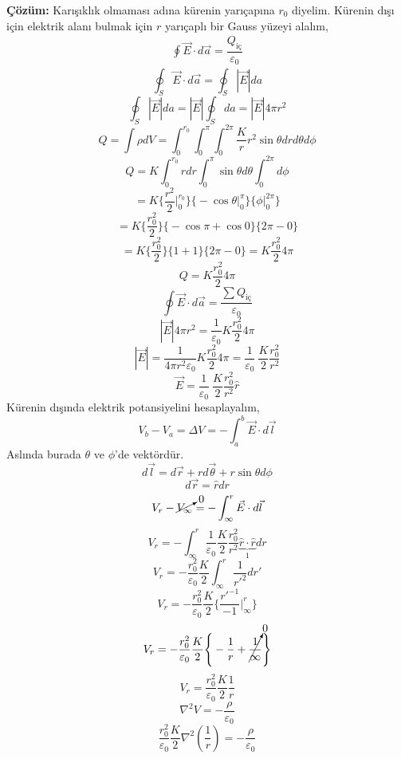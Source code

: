 	\textbf{Çözüm:} 
Karışıklık olmaması adına kürenin yarıçapına $r_{0}$ diyelim. Kürenin dışı için elektrik alanı bulmak için $r$ yarıçaplı bir Gauss yüzeyi alalım,
\begin{align*}
 \oint \Vec{E} \cdot d\Vec{a} = \dfrac{Q_{\textrm{iç}}}{ \varepsilon_{0}}
\end{align*}
\[  \oint_{S} \Vec{E} \cdot d\Vec{a} = \oint_{S} |\Vec{E}| da \]
\[\oint_{S}  |\Vec{E}| da =  |\Vec{E}| \oint_{S} da =  |\Vec{E}| 4 \pi r^{2} \]
\[ Q = \int \rho dV  = \int_{0}^{r_{0}} \int_{0}^{\pi}  \int_{0}^{2 \pi} \dfrac{K}{r} r^{2} \sin \theta dr d\theta d \phi \]
\[ Q =  K \int_{0}^{r_{0}}  r dr \int_{0}^{\pi} \sin \theta d\theta  \int_{0}^{2 \pi} d \phi \]
\[ =  K  \Bigg\{ \dfrac{r^{2}}{2} \Bigg|_{0}^{r_{0}} \Bigg\} \Bigg\{ - \cos \theta \Bigg|_{0}^{\pi} \Bigg\}  \Bigg\{ \phi \Bigg|_{0}^{2 \pi} \Bigg\} \]
\[ =  K  \Bigg\{ \dfrac{r_{0}^{2}}{2} \Bigg\} \Bigg\{ - \cos \pi + \cos 0 \Bigg\}  \Bigg\{ 2 \pi - 0 \Bigg\} \]
\[ =  K  \Bigg\{ \dfrac{r_{0}^{2}}{2} \Bigg\} \Bigg\{ 1 + 1 \Bigg\}  \Bigg\{ 2 \pi - 0 \Bigg\}  = K  \dfrac{r_{0}^{2}}{2} 4 \pi \]
\[ Q =  K  \dfrac{r_{0}^{2}}{2} 4 \pi\]
\[ \oint \Vec{E} \cdot d\Vec{a} = \dfrac{\sum Q_{\text{iç}}}{\varepsilon_{0}}  \]
\[ |\Vec{E}| 4 \pi r^{2} = \dfrac{1}{\varepsilon_{0}}  K  \dfrac{r_{0}^{2}}{2} 4 \pi \]
\[ |\Vec{E}|  = \dfrac{1}{ 4 \pi r^{2} \varepsilon_{0}}   K  \dfrac{r_{0}^{2}}{2}  4 \pi = \dfrac{1}{\varepsilon_{0}}\ \dfrac{K}{2} \dfrac{r_{0}^{2}}{r^{2}}\]
\[ \Vec{E} = \dfrac{1}{\varepsilon_{0}}\ \dfrac{K}{2} \dfrac{r_{0}^{2}}{r^{2}} \hat{r} \]
Kürenin dışında elektrik potansiyelini hesaplayalım,
\[ V_{b} - V_{a} = \Delta V = - \int_{a}^{b} \Vec{E} \cdot d \Vec{l} \]
Aslında burada $\theta$ ve $\phi$'de vektördür.
\[ d \Vec{l} = d \Vec{r} + r d \Vec{\theta} + r \sin \theta d \phi \]
\[ d \Vec{r} =\hat{r} dr \]
\[ V_{r} - \cancelto{0}{V_{\infty}}  = - \int_{\infty}^{r} \Vec{E} \cdot d \Vec{l} \]
\[ V_{r}  = - \int_{\infty}^{r}  \dfrac{1}{\varepsilon_{0}} \dfrac{K}{2} \dfrac{r_{0}^{2}}{r^{2}} \underbrace{ \hat{r} \cdot \hat{r}}_{1} dr \]
\[ V_{r}  = - \dfrac{r_{0}^{2}}{\varepsilon_{0}} \dfrac{K}{2} \int_{\infty}^{r}   \dfrac{1}{r'^{2}} dr' \]
\[ V_{r}  = - \dfrac{r_{0}^{2}}{\varepsilon_{0}} \dfrac{K}{2} \Bigg\{ \dfrac{r'^{-1}}{-1} \Bigg|_{\infty}^{r} \Bigg\} \]
\[ V_{r}  = - \dfrac{r_{0}^{2}}{\varepsilon_{0}} \dfrac{K}{2} \Bigg\{ - \dfrac{1}{r} + \cancelto{0}{\dfrac{1}{\infty}} \Bigg\} \]
\[ V_{r}  =  \dfrac{r_{0}^{2}}{\varepsilon_{0}} \dfrac{K}{2} \dfrac{1}{r}  \]
\[ \nabla^{2}V = - \dfrac{\rho}{\varepsilon_{0}} \]
\[  \dfrac{r_{0}^{2}}{\varepsilon_{0}} \dfrac{K}{2} \nabla^{2} (\dfrac{1}{r}) = - \dfrac{\rho}{\varepsilon_{0}} \]
